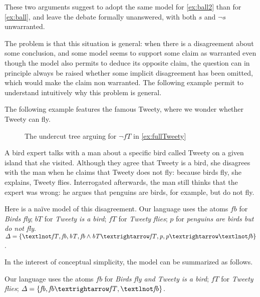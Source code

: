 \documentclass[version=3.21, pagesize, twoside=off, bibliography=totoc, DIV=calc, fontsize=12pt, a4paper, french, english]{scrartcl}
\begin{document}
These two arguments suggest to adopt the same model for \cref{ex:ball2} than for \cref{ex:ball}, and leave the debate formally unanswered, with both $\mathit{s}$ and $¬\mathit{s}$ unwarranted.

The problem is that this situation is general: when there is a disagreement about some conclusion, and some model seems to support some claim as warranted even though the model also permits to deduce its opposite claim, the question can in principle always be raised whether some implicit disagreement has been omitted, which would make the claim non warranted. The following example permit to understand intuitively why this problem is general.

The following example features the famous Tweety, where we wonder whether Tweety can fly.
\begin{figure}
	\caption{The undercut tree arguing for $¬\mathit{fT}$ in \cref{ex:fullTweety}}
	\label{fig:tweety}
\end{figure}
\begin{example}
	\label{ex:fullTweety}
	A bird expert talks with a man about a specific bird called Tweety on a given island that she visited. Although they agree that Tweety is a bird, she disagrees with the man when he claims that Tweety does not fly: because birds fly, she explains, Tweety flies. Interrogated afterwards, the man still thinks that the expert was wrong: he argues that penguins are birds, for example, but do not fly.
	
	Here is a naïve model of this disagreement.
	Our language uses the atoms 
	$\mathit{fb}$ for \emph{Birds fly}; 
	$\mathit{bT}$ for \emph{Tweety is a bird}; 
	$\mathit{fT}$ for \emph{Tweety flies}; 
	$\mathit{p}$ for \emph{penguins are birds but do not fly}.
	$\Delta = \set{¬\mathit{fT}, \mathit{fb}, \mathit{bT},\allowbreak \mathit{fb} \land \mathit{bT} → \mathit{fT}, \mathit{p},\allowbreak \mathit{p} → ¬\mathit{fb}}$.
\end{example}
In the interest of conceptual simplicity, the model can be summarized as follows.
\begin{example}
	\label{ex:shortTweety}
	Our language uses the atoms 
	$\mathit{fb}$ for \emph{Birds fly and Tweety is a bird}; 
	$\mathit{fT}$ for \emph{Tweety flies}; 
	$\Delta = \set{\mathit{fb},\allowbreak \mathit{fb} → \mathit{fT}, ¬\mathit{fb}}$.
\end{example}
\end{document}
